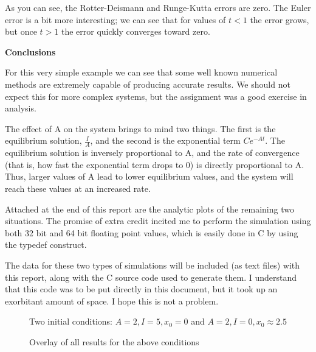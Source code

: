 \documentclass[a4paper,12pt]{article}
\begin{document}
As you can see, the Rotter-Deismann and Runge-Kutta errors are zero. The Euler error is a bit more interesting; we can see that for values of $t<1$ the error grows, but once $t>1$ the error quickly converges toward zero. 

\vfil\eject

{\bf Conclusions}
\bigskip

For this very simple example we can see that some well known numerical methods are extremely capable of producing accurate results. We should not expect this for more complex systems, but the assignment was a good exercise in analysis. 

\vspace{2mm}

The effect of A on the system brings to mind two things. The first is the equilibrium solution, $\frac{I}{A}$, and the second is the exponential term $Ce^{-At}$. The equilibrium solution is inversely proportional to A, and the rate of convergence (that is, how fast the exponential term drops to 0) is directly proportional to A. Thus, larger values of A lead to lower equilibrium values, and the system will reach these values at an increased rate. 

\vspace{2mm}

Attached at the end of this report are the analytic plots of the remaining two situations. The promise of extra credit incited me to perform the simulation using both 32 bit and 64 bit floating point values, which is easily done in C by using the typedef construct. 

\vspace{2mm}

The data for these two types of simulations will be included (as text files) with this report, along with the C source code used to generate them. I understand that this code was to be put directly in this document, but it took up an exorbitant amount of space. I hope this is not a problem. 

\vfil\eject

\begin{figure}[h!]
\begin{center}
\end{center}
\caption{\label{pict4}Two initial conditions: $A=2,I=5,x_0=0$ and $A=2,I=0,x_0\approx2.5$}
\end{figure}

\begin{figure}[h!]
\begin{center}
\end{center}
\caption{\label{pict5}Overlay of all results for the above conditions}
\end{figure}
\end{document}
